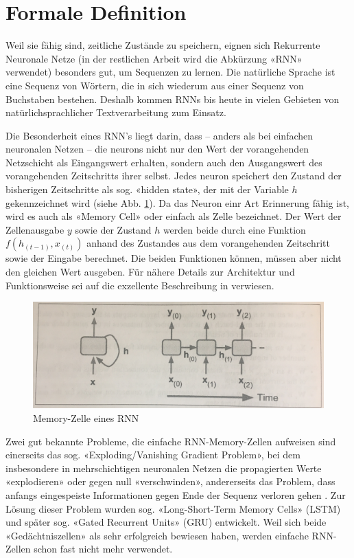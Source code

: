 \section{Formale Definition}
\label{sec:model-definition}

Weil sie fähig sind, zeitliche Zustände zu speichern, eignen sich Rekurrente Neuronale Netze (in der restlichen Arbeit wird die Abkürzung «RNN» verwendet) besonders gut, um Sequenzen zu lernen.
Die natürliche Sprache ist eine Sequenz von Wörtern, die in sich wiederum aus einer Sequenz von Buchstaben bestehen.
Deshalb kommen RNNs bis heute in vielen Gebieten von natürlichsprachlicher Textverarbeitung zum Einsatz.

Die Besonderheit eines RNN's liegt darin, dass – anders als bei einfachen neuronalen Netzen – die \glspl{neuron} nicht nur den Wert der vorangehenden Netzschicht als
Eingangswert erhalten, sondern auch den Ausgangswert des vorangehenden Zeitschritts ihrer selbst.
Jedes \gls{neuron} speichert den Zustand der bisherigen Zeitschritte als sog. «hidden state», der mit der Variable $ h $ gekennzeichnet wird (siehe Abb. \ref{fig:rnn-model-definition-memory-cell}).
Da das Neuron einr Art Erinnerung fähig ist, wird es auch als «Memory Cell» oder einfach als Zelle bezeichnet.
Der Wert der Zellenausgabe $ y $ sowie der Zustand $ h $ werden beide durch eine Funktion $ f(h_{(t-1)}, x_{(t)})$ anhand des Zustandes aus dem vorangehenden Zeitschritt sowie der Eingabe berechnet.
Die beiden Funktionen können, müssen aber nicht den gleichen Wert ausgeben.
Für nähere Details zur Architektur und Funktionsweise sei auf die exzellente Beschreibung in \autocite{geron} verwiesen.

\begin{figure}
    \centering
    \includegraphics[width=0.75\linewidth]{images/model/model-rnn-definition.jpg}
    \caption[RNN Modell]{Memory-Zelle eines RNN \autocite{geron}}
    \label{fig:rnn-model-definition-memory-cell}
\end{figure}

Zwei gut bekannte Probleme, die einfache RNN-Memory-Zellen aufweisen sind einerseits das sog. «Exploding/Vanishing Gradient Problem», bei dem insbesondere in mehrschichtigen neuronalen Netzen
die propagierten Werte «explodieren» oder gegen null «verschwinden», andererseits das Problem, dass anfangs eingespeiste Informationen gegen Ende der Sequenz verloren gehen \autocite{geron}.
Zur Lösung dieser Problem wurden sog. «Long-Short-Term Memory Cells» (LSTM)\autocite{lstm} und später sog. «Gated Recurrent Units» (GRU)\autocite{gru} entwickelt.
Weil sich beide «Gedächtniszellen» als sehr erfolgreich bewiesen haben, werden einfache RNN-Zellen schon fast nicht mehr verwendet.

